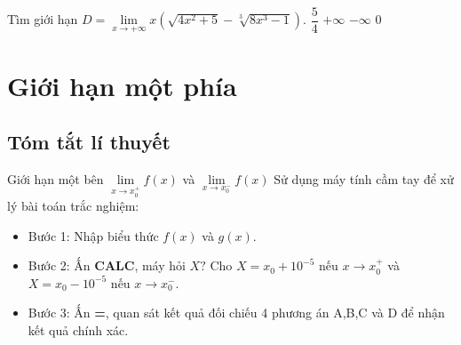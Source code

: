 \begin{vd}%
	Tìm giới hạn $D=\lim\limits_{x\to +\infty}x\left( \sqrt{4x^2+5}-\sqrt[3]{8x^3-1}\right)$.
	\choice
	{$\dfrac{5}{4}$}
	{$+\infty$}
	{$-\infty$}
	{\True $0$}
\end{vd}
\section{Giới hạn một phía}
\subsection{Tóm tắt lí thuyết}
\begin{dang}{Giới hạn một bên $\lim \limits_{x\rightarrow x_{0}^{+}}f(x)$ và $\lim \limits_{x\rightarrow x_{0}^{-}}f(x)$ }
	Sử dụng máy tính cầm tay để xử lý bài toán trắc nghiệm:
	\begin{itemize}
		\item Bước 1: Nhập biểu thức $f(x)$ và $g(x)$.
		\item Bước 2: Ấn \textbf{CALC}, máy hỏi $X?$ Cho $X=x_0+10^{-5}$ nếu $x\rightarrow x_{0}^{+}$ và  $X=x_0-10^{-5}$ nếu $x\rightarrow x_{0}^{-}$.
		\item Bước 3: Ấn \textbf{=}, quan sát kết quả đối chiếu 4 phương án A,B,C và D để nhận kết quả chính xác.
	\end{itemize}
\end{dang}
